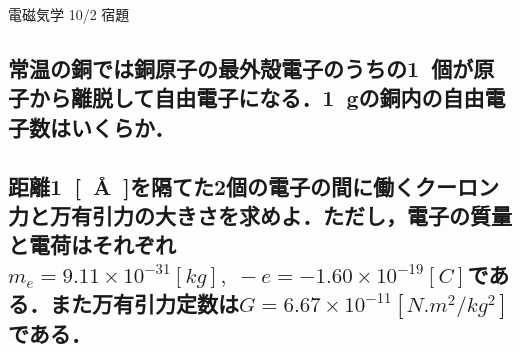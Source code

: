 \documentclass[a4j,12pt]{jsarticle}
\begin{document}
\begin{center}
    \begin{LARGE}
        {\huge 電磁気学 10/2 宿題} 
    \end{LARGE}
\end{center}

\subsection{常温の銅では銅原子の最外殻電子のうちの\SI{1}{個}が原子から離脱して自由電子になる．\SI{1}{g}の銅内の自由電子数はいくらか．}

\vspace{20em}
\subsection{距離\SI{1}{[\AA]}を隔てた2個の電子の間に働くクーロン力と万有引力の大きさを求めよ．ただし，電子の質量と電荷はそれぞれ \(m_e=9.11\times10^{-31}[\si{kg}],\;-e=-1.60\times10^{-19}[\si{C}]\)である．また万有引力定数は\(G=6.67\times10^{-11}[\si{N.m^2/kg^2}]\)である．}
\end{document}
